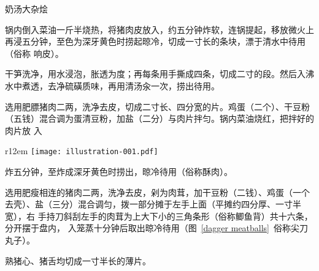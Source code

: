\begin{recipe}{奶汤大杂烩}

\ingredients


\preparation

\step 锅内倒入菜油一斤半烧热，将猪肉皮放入，约五分钟炸软，连锅提起，移放微火上
再浸五分钟，至色为深牙黄色时捞起晾冷，切成一寸长的条块，漂于清水中待用（俗称
响皮）。

\step 干笋洗净，用水浸泡，胀透为度；再每条用手撕成四条，切成二寸的段。然后入沸
水中煮透，去净硫磺质味，再用清汤汆一次，捞出待用。

\step 选用肥膘猪肉二两，洗净去皮，切成二寸长、四分宽的片。鸡蛋（二个）、干豆粉
（五钱）混合调为蛋清豆粉，加盐（二分）与肉片拌匀。锅内菜油烧红，把拌好的肉片放
入
\begin{wrapfigure}[9]{r}{12em}%
\centering%
\vspace{.3125\baselineskip}%
\quad\texttt{[image: illustration-001.pdf]}%
\vspace{-.1875\baselineskip}%
\caption{尖刀丸子作法}
\label{dagger meatballs}
\end{wrapfigure}%
炸五分钟，至炸成深牙黄色时捞出，晾冷待用（俗称酥肉）。

\step 选用肥瘦相连的猪肉二两，洗净去皮，剁为肉茸，加干豆粉（二钱）、鸡蛋（一个
去壳）、盐（三分）混合调匀，拨一部分摊于左手上面（平摊约四分厚、一寸半宽），右
手持刀斜刮左手的肉茸为上大下小的三角条形（俗称鲫鱼背）共十六条，分开摆于盘内，
入笼蒸十分钟后取出晾冷待用（图~\ref{dagger meatballs}~俗称尖刀丸子）。

\step 熟猪心、猪舌均切成一寸半长的薄片。


\end{recipe}
